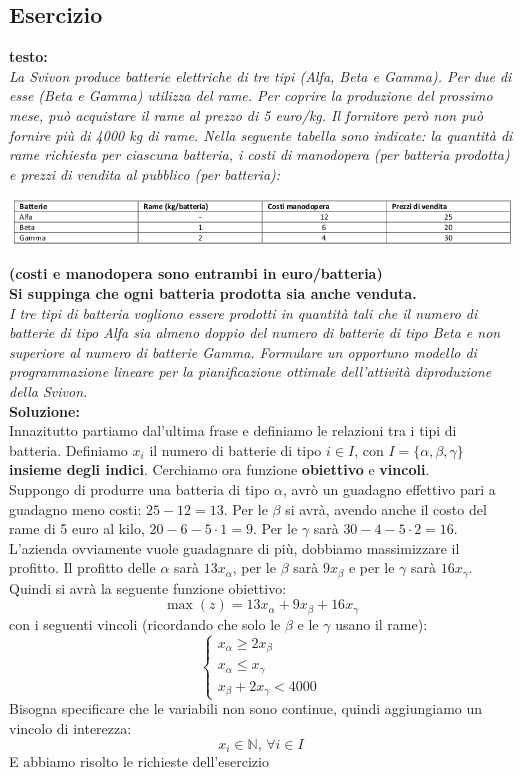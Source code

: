 \documentclass[a4paper,12pt, oneside]{book}
\begin{document}
\subsection{Esercizio}
\begin{esercizio}
  \textbf{testo:}\\
  \textit{La Svivon produce  batterie  elettriche  di  tre  tipi
    (Alfa,  Beta  e  Gamma).  Per  due  di  esse  (Beta  e  Gamma)
    utilizza del rame. Per coprire la produzione del prossimo mese, può
    acquistare il rame al prezzo di 5 euro/kg. Il fornitore però non
    può fornire più di 4000  kg  di rame.  Nella  seguente  tabella
    sono  indicate: la  quantità di  rame  richiesta  per  ciascuna
    batteria, i costi di manodopera (per batteria prodotta) e prezzi
    di vendita al pubblico (per batteria):}
  \begin{center}
    \includegraphics[scale = 0.7]{img/es1.png}
  \end{center}
  \textbf{(costi e manodopera sono entrambi in euro/batteria)}\\
  \textbf{Si suppinga che ogni batteria prodotta sia anche venduta.}\\
  \textit{I tre tipi di batteria vogliono essere prodotti in quantità
    tali che il numero di batterie di tipo Alfa sia almeno doppio del
    numero  di  batterie  di  tipo  Beta  e  non  superiore  al
    numero di  batterie  Gamma.  Formulare un  opportuno  modello
    di programmazione lineare per la pianificazione ottimale
    dell’attività diproduzione della Svivon.}\\
  \textbf{Soluzione:}\\
  Innazitutto partiamo dal'ultima frase e definiamo le relazioni tra i
  tipi di batteria. Definiamo $x_i$ il numero di batterie di tipo
  $i\in I$, con   $I=\{\alpha, \beta, \gamma\}$ \textbf{insieme degli
    indici}. Cerchiamo ora funzione \textbf{obiettivo} e
  \textbf{vincoli}.\\
  Suppongo di produrre una batteria di tipo $\alpha$, avrò un guadagno
  effettivo pari a guadagno meno costi: $25-12=13$. Per le $\beta$ si
  avrà, avendo anche il costo del rame di 5 euro al kilo, $20-6-5\cdot
  1= 9$. Per le $\gamma$ sarà $30-4-5\cdot 2 = 16$. L'azienda
  ovviamente vuole guadagnare di più, dobbiamo massimizzare il
  profitto. Il profitto delle $\alpha$ sarà $13x_\alpha$, per le
  $\beta$ sarà $9x_\beta$ e per le $\gamma$ sarà $16x_\gamma$.
  Quindi si avrà la seguente funzione obiettivo:
  \[\max(z) = 13x_\alpha+ 9x_\beta +16x_\gamma\]
  con i seguenti vincoli (ricordando che solo le $\beta$ e le $\gamma$
  usano il rame):
  \[
    \begin{cases}
      x_\alpha \geq 2x_\beta \\
      x_\alpha \leq x_\gamma \\
      x_\beta +2x_\gamma < 4000
    \end{cases}
  \]
  Bisogna specificare che le variabili non sono continue, quindi
  aggiungiamo un vincolo di interezza:
  \[x_i\in\mathbb{N},\, \forall i\in I\]
  E abbiamo risolto le richieste dell'esercizio
\end{esercizio}
\end{document}
